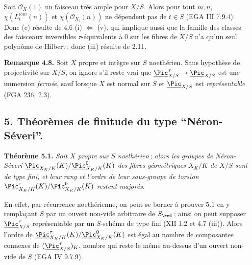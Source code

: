 Soit \(\mathcal O_X(1)\) un faisceau tr\`es ample pour \(X/S\). Alors pour tout \(m,n\), \(\chi(L_t^{\otimes m}(n))\) et \(\chi(\mathcal O_{X_t}(n))\) ne d\'ependent pas de \(t\in S\) (EGA III 7.9.4). Donc (c) r\'esulte de 4.6 (i) \(\Longleftrightarrow\) (v), qui implique aussi que la famille des classes des faisceaux inversibles \(\tau\)-\'equivalents \`a \(0\) sur les fibres de \(X/S\) n'a qu'un
seul polyn\^ome de Hilbert\,; donc (iii) r\'esulte de 2.11.

\textbf{Remarque 4.8.} Soit \(X\) propre et int\`egre sur \(S\) noeth\'erien. Sans hypoth\`ese de projectivit\'e sur \(X/S\), on ignore s'il reste vrai que \(\underline{\Pic}^\tau_{X/S}\to\underline{\Pic}_{X/S}\) est une immersion \emph{ferm\'ee}, sauf lorsque \(X\) est normal sur \(S\) et \(\underline{\Pic}_{X/S}\) est \emph{repr\'esentable} (FGA 236, 2.3).

\providecommand{\NS}{\operatorname{NS}}
\providecommand{\Picard}{\operatorname{Pic}}
\providecommand{\Et}{\mathrm{et}}
\providecommand{\rk}{\operatorname{rk}}
\providecommand{\im}{\operatorname{Im}}
\providecommand{\HH}{\mathrm H}


\subsection*{5. Th\'eor\`emes de finitude du type ``N\'eron-S\'everi''.}

\textbf{Th\'eor\`eme 5.1.} \emph{Soit \(X\) propre sur \(S\) noeth\'erien\,; alors les groupes de N\'eron-S\'everi \(\underline{\Pic}_{X_K/K}(K)/\underline{\Pic}^0_{X_K/K}(K)\) des fibres g\'eom\'etriques \(X_K/K\) de \(X/S\) sont de type fini, et leur rang et l'ordre de leur sous-groupe de torsion \(\underline{\Pic}^\tau_{X_K/K}(K)/\underline{\Pic}^0_{X_K/K}(K)\) restent major\'es.}

En effet, par r\'ecurrence noeth\'erienne, on peut se borner \`a prouver 5.1 en y rempla\c{c}ant \(S\) par un ouvert non-vide arbitraire de \(S_{\red}\)\,; ainsi on peut supposer \(\underline{\Pic}^\tau_{X/S}\) repr\'esentable par un \(S\)-sch\'ema de type fini (XII 1.2 et 4.7 (iii)). Alors l'ordre de \(\underline{\Pic}^\tau_{X_K/K}(K)/\underline{\Pic}^0_{X_K/K}(K)\) est \'egal au nombre de composantes connexes de \((\underline{\Pic}^\tau_{X/S})_K\), nombre qui reste le m\^eme au-dessus d'un ouvert non-vide de \(S\) (EGA IV 9.7.9).

